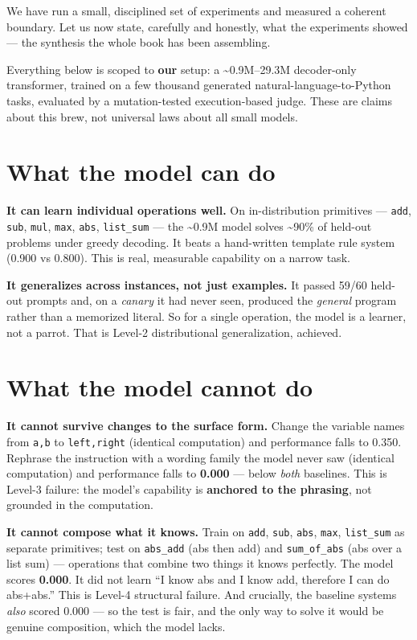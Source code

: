 We have run a small, disciplined set of experiments and measured a
coherent boundary. Let us now state, carefully and honestly, what the
experiments showed --- the synthesis the whole book has been assembling.

Everything below is scoped to \textbf{our} setup: a
\textasciitilde0.9M--29.3M decoder-only transformer, trained on a few
thousand generated natural-language-to-Python tasks, evaluated by a
mutation-tested execution-based judge. These are claims about this brew,
not universal laws about all small models.

\section{What the model can do}\label{what-the-model-can-do}

\textbf{It can learn individual operations well.} On in-distribution
primitives --- \texttt{add}, \texttt{sub}, \texttt{mul}, \texttt{max},
\texttt{abs}, \texttt{list\_sum} --- the \textasciitilde0.9M model
solves \textasciitilde90\% of held-out problems under greedy decoding.
It beats a hand-written template rule system (0.900 vs 0.800). This is
real, measurable capability on a narrow task.

\textbf{It generalizes across instances, not just examples.} It passed
59/60 held-out prompts and, on a \emph{canary} it had never seen,
produced the \emph{general} program rather than a memorized literal. So
for a single operation, the model is a learner, not a parrot. That is
Level-2 distributional generalization, achieved.

\section{What the model cannot do}\label{what-the-model-cannot-do}

\textbf{It cannot survive changes to the surface form.} Change the
variable names from \texttt{a,b} to \texttt{left,right} (identical
computation) and performance falls to 0.350. Rephrase the instruction
with a wording family the model never saw (identical computation) and
performance falls to \textbf{0.000} --- below \emph{both} baselines.
This is Level-3 failure: the model's capability is \textbf{anchored to
the phrasing}, not grounded in the computation.

\textbf{It cannot compose what it knows.} Train on \texttt{add},
\texttt{sub}, \texttt{abs}, \texttt{max}, \texttt{list\_sum} as separate
primitives; test on \texttt{abs\_add} (abs then add) and
\texttt{sum\_of\_abs} (abs over a list sum) --- operations that combine
two things it knows perfectly. The model scores \textbf{0.000}. It did
not learn ``I know abs and I know add, therefore I can do abs+abs.''
This is Level-4 structural failure. And crucially, the baseline systems
\emph{also} scored 0.000 --- so the test is fair, and the only way to
solve it would be genuine composition, which the model lacks.


